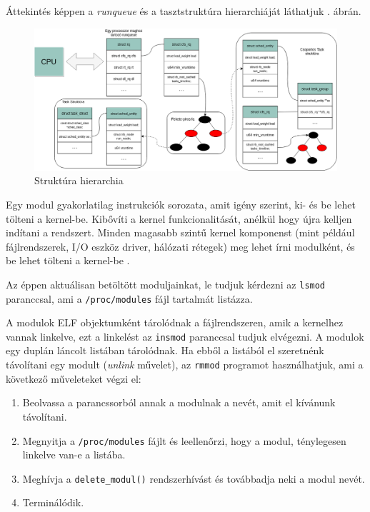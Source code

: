 Áttekintés képpen a \textit{runqueue} és a tasztstruktúra hierarchiáját láthatjuk . ábrán.

\begin{figure}[h!]
\centering
\includegraphics[width=\textwidth]{images/structureHierarchy.png}
\caption{Struktúra hierarchia}
\label{fig:structurehierarchi}
\end{figure}


Egy modul gyakorlatilag instrukciók sorozata, amit igény szerint, ki- és be lehet tölteni a kernel-be. Kibővíti a kernel funkcionalitását, anélkül hogy újra kelljen indítani a rendszert. Minden magasabb szintű kernel komponenst (mint például fájlrendszerek, I/O eszköz driver, hálózati rétegek) meg lehet írni modulként, és be lehet tölteni a kernel-be \cite{salzman2007linux, bovet2005understanding}.

Az éppen aktuálisan betöltött moduljainkat, le tudjuk kérdezni az \texttt{lsmod} paranccsal, ami a \texttt{/proc/modules} fájl tartalmát listázza.

A modulok ELF objektumként tárolódnak a fájlrendszeren, amik a kernelhez vannak linkelve, ezt a linkelést az \texttt{insmod} paranccsal tudjuk elvégezni.
A modulok egy duplán láncolt listában tárolódnak.
Ha ebből a listából el szeretnénk távolítani egy modult (\textit{unlink} művelet), az \texttt{rmmod} programot használhatjuk, ami a következő műveleteket végzi el:
\begin{enumerate}
	\item Beolvassa a parancssorból annak a modulnak a nevét, amit el kívánunk távolítani.
	\item Megnyitja a \texttt{/proc/modules} fájlt és leellenőrzi, hogy a modul, ténylegesen linkelve van-e a listába.
	\item Meghívja a \texttt{delete\_modul()} rendszerhívást és továbbadja neki a modul nevét.
	\item Terminálódik.
\end{enumerate} 

